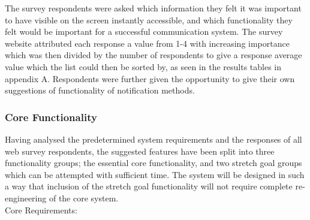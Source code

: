 \documentclass[a4paper, 12pt, notitlepage]{report}
\begin{document}
The survey respondents were asked which information they felt it was important to have visible on the screen instantly accessible, and which functionality they felt would be important for a successful communication system.  The survey website attributed each response a value from 1-4 with increasing importance which was then divided by the number of respondents to give a response average value which the list could then be sorted by, as seen in the results tables in appendix A.  Respondents were further given the opportunity to give their own suggestions of functionality of notification methods.

\subsubsection{Core Functionality}

Having analysed the predetermined system requirements and the responses of all web survey respondents, the suggested features have been split into three functionality groups; the essential core functionality, and two stretch goal groups which can be attempted with sufficient time.  The system will be designed in such a way that inclusion of the stretch goal functionality will not require complete re-engineering of the core system.\\

Core Requirements:
\end{document}
